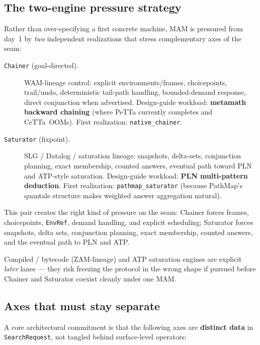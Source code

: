\documentclass[11pt]{article}
\newcommand{\code}[1]{\texttt{#1}}
\newcommand{\PeTTa}{\textup{PeTTa}}
\newcommand{\CeTTa}{\textup{CeTTa}}
\newcommand{\PathMap}{\textup{PathMap}}
\begin{document}
\subsection{The two-engine pressure strategy}

Rather than over-specifying a first concrete machine, MAM is
pressured from day~1 by \emph{two} independent realizations that
stress complementary axes of the seam:

\begin{description}
\item[\code{Chainer} (goal-directed).]  WAM-lineage control: explicit
  environments/frames, choicepoints, trail/undo, deterministic
  tail-path handling, bounded-demand response, direct conjunction
  when advertised.  Design-guide workload: \textbf{metamath backward
    chaining} (where \PeTTa{} currently completes and \CeTTa{}~OOMs).
  First realization: \code{native\_chainer}.
\item[\code{Saturator} (fixpoint).]  SLG / Datalog / saturation
  lineage: snapshots, delta-sets, conjunction planning, exact
  membership, counted answers, eventual path toward PLN and
  ATP-style saturation.  Design-guide workload: \textbf{PLN
    multi-pattern deduction}.  First realization: \code{pathmap\_saturator}
  (because \PathMap{}'s quantale structure makes weighted answer
  aggregation natural).
\end{description}

This pair creates the right kind of pressure on the seam: Chainer
forces frames, choicepoints, \code{EnvRef}, demand handling, and
explicit scheduling; Saturator forces snapshots, delta sets,
conjunction planning, exact membership, counted answers, and the
eventual path to PLN and ATP.

Compiled / bytecode (ZAM-lineage) and ATP saturation engines are
explicit \emph{later} lanes --- they risk freezing the protocol in
the wrong shape if pursued before Chainer and Saturator coexist
cleanly under one MAM.

\subsection{Axes that must stay separate}

A core architectural commitment is that the following axes are
\textbf{distinct data} in \code{SearchRequest}, not tangled behind
surface-level operators:
\end{document}
